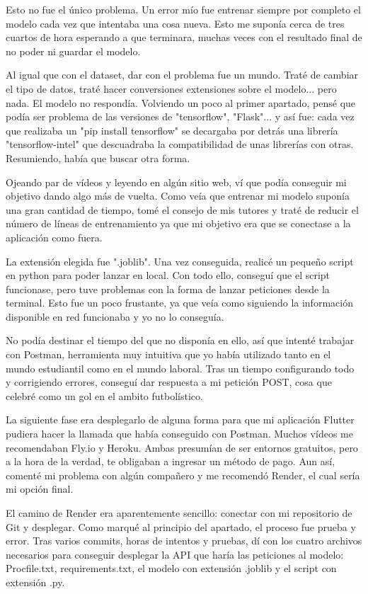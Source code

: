 	Esto no fue el único problema. Un error mío fue entrenar siempre por completo el modelo cada vez que intentaba una cosa nueva. Esto me suponía cerca de tres cuartos de hora esperando a que terminara, muchas veces con el resultado final de no poder ni guardar el modelo. 
	
	Al igual que con el dataset, dar con el problema fue un mundo. Traté de cambiar el tipo de datos, traté hacer conversiones extensiones sobre el modelo... pero nada. El modelo no respondía. Volviendo un poco al primer apartado, pensé que podía ser problema de las versiones de "tensorflow", "Flask"... y así fue: cada vez que realizaba un "pip install tensorflow" se decargaba por detrás una librería "tensorflow-intel" que descuadraba la compatibilidad de unas librerías con otras. Resumiendo, había que buscar otra forma.
	
	Ojeando par de vídeos y leyendo en algún sitio web, ví que podía conseguir mi objetivo dando algo más de vuelta. Como veía que entrenar mi modelo suponía una gran cantidad de tiempo, tomé el consejo de mis tutores y traté de reducir el número de líneas de entrenamiento ya que mi objetivo era que se conectase a la aplicación como fuera.
	
	La extensión elegida fue ".joblib". Una vez conseguida, realicé un pequeño script en python para poder lanzar en local. Con todo ello, conseguí que el script funcionase, pero tuve problemas con la forma de lanzar peticiones desde la terminal. Esto fue un poco frustante, ya que veía como siguiendo la información disponible en red funcionaba y yo no lo conseguía.
	
	No podía destinar el tiempo del que no disponía en ello, así que intenté trabajar con Postman, herramienta muy intuitiva que yo había utilizado tanto en el mundo estudiantil como en el mundo laboral. Tras un tiempo configurando todo y corrigiendo errores, conseguí dar respuesta a mi petición POST, cosa que celebré como un gol en el ambito futbolístico.
	
	La siguiente fase era desplegarlo de alguna forma para que mi aplicación Flutter pudiera hacer la llamada que había conseguido con Postman. Muchos vídeos me recomendaban Fly.io y Heroku. Ambas presumían de ser entornos gratuitos, pero a la hora de la verdad, te obligaban a ingresar un método de pago. Aun así, comenté mi problema con algún compañero y me recomendó Render, el cual sería mi opción final.
	
	El camino de Render era aparentemente sencillo: conectar con mi repositorio de Git y desplegar. Como marqué al principio del apartado, el proceso fue prueba y error. Tras varios commits, horas de intentos y pruebas, dí con los cuatro archivos necesarios para conseguir desplegar la API que haría las peticiones al modelo: Procfile.txt, requirements.txt, el modelo con extensión .joblib y el script con extensión .py.
	

